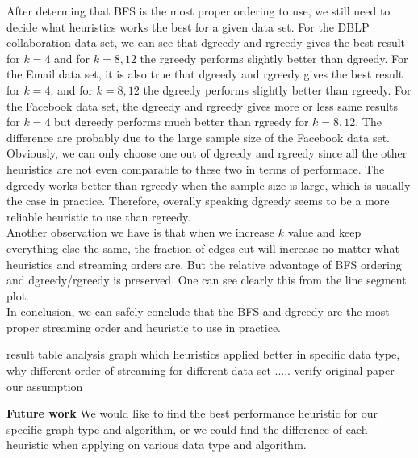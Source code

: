 \documentclass[12pt]{article}
\begin{document}
After determing that BFS is the most proper ordering to use, we still need to decide what heuristics works the best for a given data set. For the DBLP collaboration data set, we can see that dgreedy and rgreedy gives the best result for $k=4$ and for $k=8, 12$ the rgreedy performs slightly better than dgreedy. For the Email data set, it is also true that dgreedy and rgreedy gives the best result for $k=4$, and for $k=8, 12$ the dgreedy performs slightly better than rgreedy. For the Facebook data set, the dgreedy and rgreedy gives more or less same results for $k=4$ but dgreedy performs much better than rgreedy for $k=8, 12$. The difference are probably due to the large sample size of the Facebook data set. Obviously, we can only choose one out of dgreedy and rgreedy since all the other heuristics are not even comparable to these two in terms of performace. The dgreedy works better than rgreedy when the sample size is large, which is usually the case in practice. Therefore, overally speaking dgreedy seems to be a more reliable heuristic to use than rgreedy.\\

Another observation we have is that when we increase $k$ value and keep everything else the same, the fraction of edges cut will increase no matter what heuristics and streaming orders are. But the relative advantage of BFS ordering and dgreedy/rgreedy is preserved. One can see clearly this from the line segment plot. \\

In conclusion, we can safely conclude that the BFS and dgreedy are the most proper streaming order and heuristic to use in practice. 

 result table
 analysis graph
 	which heuristics applied better in specific data type, why
	different order of streaming for different data set
	.....
verify original paper
our assumption

\textbf{Future work}
We would like to find the best performance heuristic for our specific graph type and algorithm, or we could find the difference of each heuristic when applying on various data type and algorithm.



\end{document}
